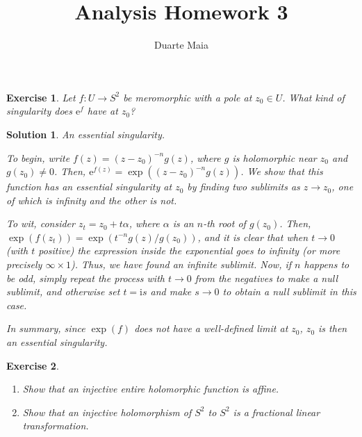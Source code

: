 \documentclass{article}
\title{Analysis Homework 3}
\author{Duarte Maia}
\newtheorem{ex}{Exercise}
\theoremstyle{nonumberplain}
\newtheorem{sol}{Solution}
\newcommand{\I}{\mathrm{i}}
\newcommand{\e}{\mathrm{e}}
\begin{document}
\maketitle

\begin{ex}
Let $f \colon U \to S^2$ be meromorphic with a pole at $z_0 \in U$. What kind of singularity does $\e^f$ have at $z_0$?
\end{ex}

\begin{sol}
An essential singularity.

To begin, write $f(z) = (z-z_0)^{-n} g(z)$, where $g$ is holomorphic near $z_0$ and $g(z_0) \neq 0$. Then, $\e^{f(z)} = \exp((z-z_0)^{-n} g(z))$. We show that this function has an essential singularity at $z_0$ by finding two sublimits as $z \to z_0$, one of which is infinity and the other is not.

To wit, consider $z_t = z_0 + t \alpha$, where $\alpha$ is an $n$-th root of $g(z_0)$. Then, $\exp(f(z_t)) = \exp(t^{-n} g(z)/g(z_0))$, and it is clear that when $t \to 0$ (with $t$ positive) the expression inside the exponential goes to infinity (or more precisely $\infty \times 1$). Thus, we have found an infinite sublimit. Now, if $n$ happens to be odd, simply repeat the process with $t \to 0$ from the negatives to make a null sublimit, and otherwise set $t = \I s$ and make $s \to 0$ to obtain a null sublimit in this case.

In summary, since $\exp(f)$ does not have a well-defined limit at $z_0$, $z_0$ is then an essential singularity. 
\end{sol}

\begin{ex}
\leavevmode
\begin{enumerate}
\item Show that an injective entire holomorphic function is affine.
\item Show that an injective holomorphism of $S^2$ to $S^2$ is a fractional linear transformation.
\end{enumerate}
\end{ex}
\end{document}
